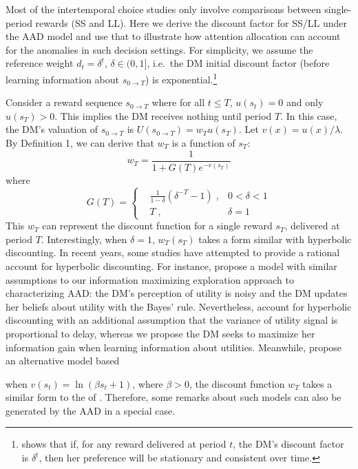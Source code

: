 \documentclass[
  12pt,
]{article}
\begin{document}
Most of the intertemporal choice studies only involve comparisons
between single-period rewards (SS and LL). Here we derive the discount
factor for SS/LL under the AAD model and use that to illustrate how
attention allocation can account for the anomalies in such decision
settings. For simplicity, we assume the reference weight
\(d_t = \delta^t\), \(\delta\in(0,1]\), i.e.~the DM initial discount
factor (before learning information about \(s_{0\rightarrow T}\)) is
exponential.\footnote{\citet{strotz1955myopia} shows that if, for any
  reward delivered at period \(t\), the DM's discount factor is
  \(\delta^t\), then her preference will be stationary and consistent
  over time.}

Consider a reward sequence \(s_{0\rightarrow T}\) where for all
\(t\leq T\), \(u(s_t)=0\) and only \(u(s_T)>0\). This implies the DM
receives nothing until period \(T\). In this case, the DM's valuation of
\(s_{0\rightarrow T}\) is \(U(s_{0\rightarrow T})=w_Tu(s_T)\). Let
\(v(x)=u(x)/\lambda\). By Definition 1, we can derive that \(w_T\) is a
function of \(s_T\):\[\tag{3}
 w_T = \frac{1}{1+G(T)e^{-v(s_T)}}
\]where\[ G(T) = \left\{ \begin{aligned} & \frac{1}{1-\delta}(\delta^{-T}-1) \; ,& 0<\delta<1\\ & T\; ,& \delta=1\ \end{aligned} \right. \]This
\(w_T\) can represent the discount function for a single reward \(s_T\),
delivered at period \(T\). Interestingly, when \(\delta=1\),
\(w_T(s_T)\) takes a form similar with hyperbolic discounting. In recent
years, some studies have attempted to provide a rational account for
hyperbolic discounting. For instance, \citet{gabaix2017myopia} propose a
model with similar assumptions to our information maximizing exploration
approach to characterizing AAD: the DM's perception of utility is noisy
and the DM updates her beliefs about utility with the Bayes' rule.
Nevertheless, \citet{gabaix2017myopia} account for hyperbolic
discounting with an additional assumption that the variance of utility
signal is proportional to delay, whereas we propose the DM seeks to
maximize her information gain when learning information about utilities.
Meanwhile, \citet{gershman2020rationally} propose an alternative model
based

when \(v(s_t)=\ln(\beta s_t+1)\), where \(\beta>0\), the discount
function \(w_T\) takes a similar form to the of
\citet{gershman2020rationally}. Therefore, some remarks about such
models can also be generated by the AAD in a special case.
\end{document}
